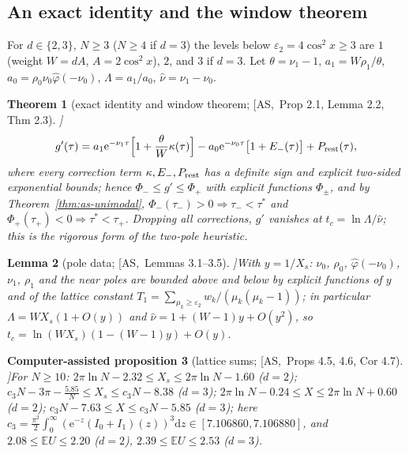 \documentclass[10pt,a4paper]{article}
\theoremstyle{plain}
\newtheorem{theorem}{Theorem}[section]
\newtheorem{lemma}[theorem]{Lemma}
\newtheorem{caproposition}[theorem]{Computer-assisted proposition}
\theoremstyle{definition}
\newcommand{\src}[2]{[\textsf{#1},~#2]}           %
\newcommand{\ASY}{\textsf{AS}}
\newcommand{\E}{\mathbb{E}}
\newcommand{\ee}{\mathrm{e}}
\newcommand{\dd}{\mathrm{d}}
\begin{document}
\subsection{An exact identity and the window theorem}

For $d\in\{2,3\}$, $N\ge3$ ($N\ge4$ if $d=3$) the levels below $\varepsilon_2=4\cos^2x\ge3$ are $1$ (weight $W=dA$, $A=2\cos^2x$), $2$, and $3$ if $d=3$. Let $\theta=\nu_1-1$, $a_1=W\rho_1/\theta$, $a_0=\rho_0\nu_0\hat\varphi(-\nu_0)$, $\Lambda=a_1/a_0$, $\hat\nu=\nu_1-\nu_0$.

\begin{theorem}[exact identity and window theorem; \src{\ASY}{Prop 2.1, Lemma 2.2, Thm 2.3}]\label{thm:window}
\[
g'(\tau)=a_1\ee^{-\nu_1\tau}\Bigl[1+\frac\theta W\kappa(\tau)\Bigr]-a_0\ee^{-\nu_0\tau}\bigl[1+E_-(\tau)\bigr]+P_{\rm rest}(\tau),
\]
where every correction term $\kappa,E_-,P_{\rm rest}$ has a definite sign and explicit two-sided exponential bounds; hence $\Phi_-\le g'\le\Phi_+$ with explicit functions $\Phi_\pm$, and by Theorem~\ref{thm:as-unimodal}, $\Phi_-(\tau_-)>0\Rightarrow\tau_-<\tau^*$ and $\Phi_+(\tau_+)<0\Rightarrow\tau^*<\tau_+$. Dropping all corrections, $g'$ vanishes at $t_c=\ln\Lambda/\hat\nu$; this is the rigorous form of the two-pole heuristic.
\end{theorem}

\begin{lemma}[pole data; \src{\ASY}{Lemmas 3.1--3.5}]\label{lem:poledata}
With $y=1/X_s$: $\nu_0$, $\rho_0$, $\hat\varphi(-\nu_0)$, $\nu_1$, $\rho_1$ and the near poles are bounded above and below by explicit functions of $y$ and of the lattice constant $T_1=\sum_{\mu_k\ge\varepsilon_2}w_k/(\mu_k(\mu_k-1))$; in particular $\Lambda=WX_s(1+O(y))$ and $\hat\nu=1+(W-1)y+O(y^2)$, so $t_c=\ln(WX_s)(1-(W-1)y)+O(y)$.
\end{lemma}

\begin{caproposition}[lattice sums; \src{\ASY}{Props 4.5, 4.6, Cor 4.7}]\label{prop:Xs}
For $N\ge10$: $2\pi\ln N-2.32\le X_s\le2\pi\ln N-1.60$ ($d=2$); $c_3N-3\pi-\frac{5.85}N\le X_s\le c_3N-8.38$ ($d=3$); $2\pi\ln N-0.24\le X\le2\pi\ln N+0.60$ ($d=2$); $c_3N-7.63\le X\le c_3N-5.85$ ($d=3$); here $c_3=\frac{\pi^2}2\int_0^\infty(\ee^{-z}(I_0+I_1)(z))^3\dd z\in[7.106860,7.106880]$, and $2.08\le\E U\le2.20$ ($d=2$), $2.39\le\E U\le2.53$ ($d=3$).
\end{caproposition}
\end{document}
